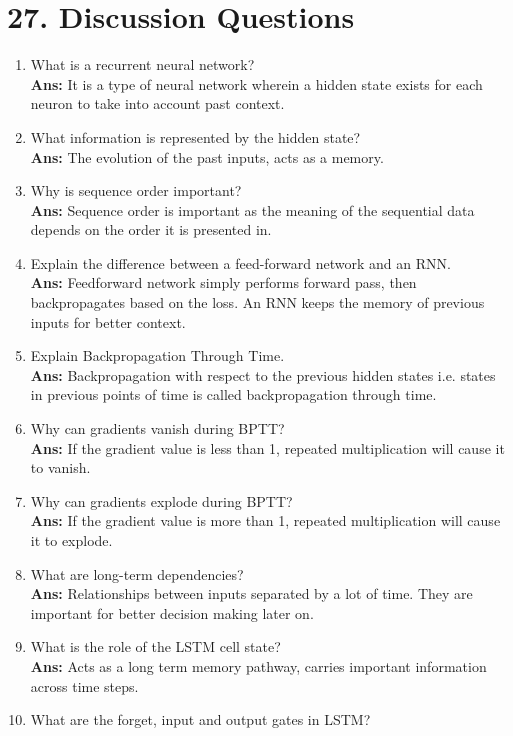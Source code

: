 \documentclass[10pt]{article}
\begin{document}
\section*{27. Discussion Questions}

\begin{enumerate}
\item What is a recurrent neural network?\\
\textbf{Ans:} It is a type of neural network wherein a hidden state exists for each neuron to take into account past context.
\item What information is represented by the hidden state?\\
\textbf{Ans:} The evolution of the past inputs, acts as a memory.
\item Why is sequence order important?\\
\textbf{Ans:} Sequence order is important as the meaning of the sequential data depends on the order it is presented in.
\item Explain the difference between a feed-forward network and an RNN.\\
\textbf{Ans:} Feedforward network simply performs forward pass, then backpropagates based on the loss. An RNN keeps the memory of previous inputs for better context.
\item Explain Backpropagation Through Time.\\
\textbf{Ans:} Backpropagation with respect to the previous hidden states i.e. states in previous points of time is called backpropagation through time.
\item Why can gradients vanish during BPTT?\\
\textbf{Ans:} If the gradient value is less than 1, repeated multiplication will cause it to vanish.
\item Why can gradients explode during BPTT?\\
\textbf{Ans:} If the gradient value is more than 1, repeated multiplication will cause it to explode.
\item What are long-term dependencies?\\
\textbf{Ans:} Relationships between inputs separated by a lot of time. They are important for better decision making later on.
\item What is the role of the LSTM cell state?\\
\textbf{Ans:} Acts as a long term memory pathway, carries important information across time steps.
\item What are the forget, input and output gates in LSTM?\\

\end{enumerate}
\end{document}
